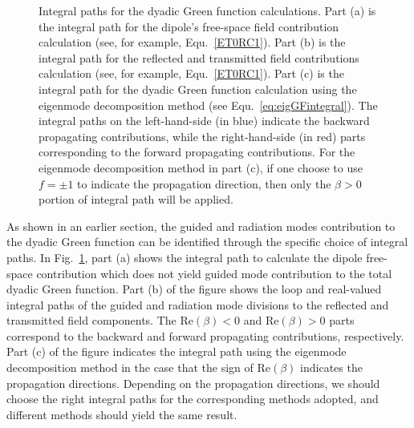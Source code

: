 \documentclass[]{report}
\begin{document}
\begin{figure}
\centering{}
\caption{Integral paths for the dyadic Green function calculations. Part (a) is the integral path for the dipole's free-space field contribution calculation (see, for example, Equ.~\eqref{ET0RC1}). Part (b) is the integral path for the reflected and transmitted field contributions calculation (see, for example, Equ.~\eqref{ET0RC1}). Part (c) is the integral path for the dyadic Green function calculation using the eigenmode decomposition method (see Equ.~\eqref{eq:eigGFintegral}). The integral paths on the left-hand-side (in blue) indicate the backward propagating contributions, while the right-hand-side (in red) parts corresponding to the forward propagating contributions. For the eigenmode decomposition method in part (c), if one choose to use $ f=\pm 1 $ to indicate the propagation direction, then only the $ \beta>0 $ portion of integral path will be applied. }
\label{fig:integralpaths}
\end{figure}

As shown in an earlier section, the guided and radiation modes contribution to the dyadic Green function can be identified through the specific choice of integral paths. In Fig.~\ref{fig:integralpaths}, part (a) shows the integral path to calculate the dipole free-space contribution which does not yield guided mode contribution to the total dyadic Green function. Part (b) of the figure shows the loop and real-valued integral paths of the guided and radiation mode divisions to the reflected and transmitted field components. The $ \mathrm{Re}(\beta)<0 $ and $ \mathrm{Re}(\beta)>0 $ parts correspond to the backward and forward propagating contributions, respectively. Part (c) of the figure indicates the integral path using the eigenmode decomposition method in the case that the sign of $ \mathrm{Re}(\beta) $ indicates the propagation directions. Depending on the propagation directions, we should choose the right integral paths for the corresponding methods adopted, and different methods should yield the same result. 
\end{document}
